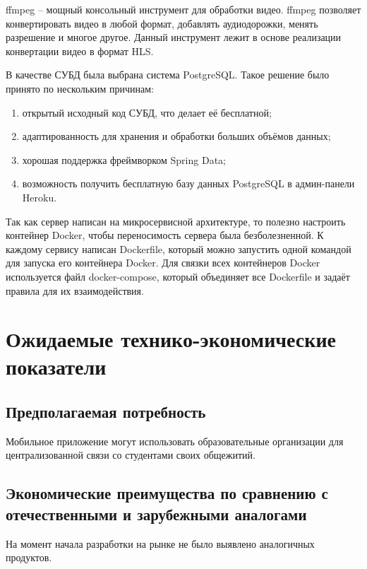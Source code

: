 \documentclass{../includes/TechDoc}
\begin{document}
    ffmpeg -- мощный консольный инструмент для обработки видео.
    ffmpeg позволяет конвертировать видео в любой формат, добавлять аудиодорожки, менять разрешение и многое другое.
    Данный инструмент лежит в основе реализации конвертации видео в формат HLS.

    В качестве СУБД была выбрана система PostgreSQL\@.
    Такое решение было принято по нескольким причинам:
    \begin{enumerate}
        \item открытый исходный код СУБД, что делает её бесплатной;
        \item адаптированность для хранения и обработки больших объёмов данных;
        \item хорошая поддержка фреймворком Spring Data;
        \item возможность получить бесплатную базу данных PostgreSQL в админ-панели Heroku.
    \end{enumerate}

    Так как сервер написан на микросервисной архитектуре, то полезно настроить контейнер Docker, чтобы переносимость сервера была безболезненной.
    К каждому сервису написан Dockerfile, который можно запустить одной командой для запуска его контейнера Docker.
    Для связки всех контейнеров Docker используется файл docker-compose, который объединяет все Dockerfile и задаёт правила для их взаимодействия.

    \section{Ожидаемые технико-экономические показатели}

    \subsection{Предполагаемая потребность}

    Мобильное приложение могут использовать образовательные организации для централизованной связи со студентами своих
    общежитий.

    \subsection{Экономические преимущества по сравнению с отечественными и зарубежными аналогами}

    На момент начала разработки на рынке не было выявлено аналогичных продуктов.

    \clearpage
\end{document}
